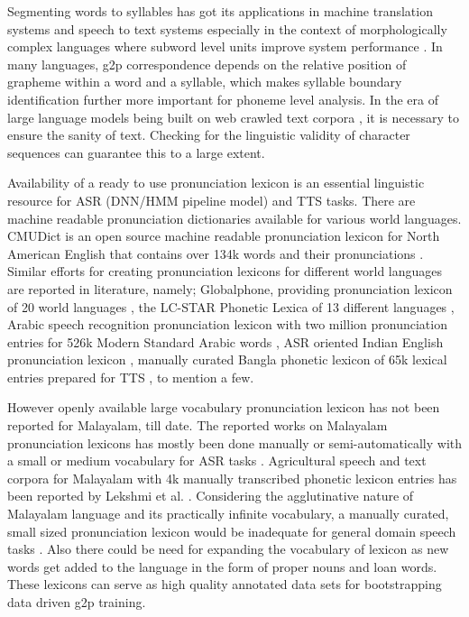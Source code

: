 \documentclass{ieeeaccess}
\begin{document}
Segmenting words to syllables has got its applications in machine translation systems and speech to text systems especially in the context of morphologically complex languages where subword level units improve system performance \cite{kunchukuttan2016, SMIT2021101158}. In many languages, g2p correspondence depends on the relative position of grapheme within a word and a syllable, which makes syllable boundary identification further more important for phoneme level analysis. In the era of large language models being built on web crawled text corpora \cite{kunchukuttan2020ai4bharat}, it is necessary to ensure the sanity of text. Checking for the linguistic validity of character sequences can guarantee this to a large extent.

Availability of a ready to use pronunciation lexicon is an essential linguistic resource for ASR (DNN/HMM pipeline model) and TTS tasks. There are machine readable pronunciation dictionaries available for various world languages. CMUDict is an open source machine readable pronunciation lexicon for North American English that contains over 134k words and their pronunciations \cite{lenzo2007cmu}. Similar efforts for creating pronunciation lexicons for different world languages are reported in literature, namely; Globalphone, providing pronunciation lexicon of 20 world languages  \cite{schultz-schlippe-2014-globalphone}, the LC-STAR Phonetic Lexica of 13 different languages  \cite{castell2004lc}, Arabic speech recognition pronunciation lexicon with two million pronunciation entries for 526k Modern Standard Arabic words \cite{ali2017}, ASR oriented Indian English pronunciation lexicon  \cite{huang-etal-2020-construction}, manually curated Bangla phonetic lexicon of 65k lexical entries prepared for TTS  \cite{ttsbangla}, to mention a few.

However openly available large vocabulary pronunciation lexicon has not been reported for Malayalam, till date. The reported works on Malayalam pronunciation lexicons has mostly been done manually or semi-automatically with a small or medium vocabulary for ASR tasks \cite{cinikurian,deekshitha}. Agricultural speech and text corpora for Malayalam with 4k manually transcribed phonetic lexicon entries has been  reported by Lekshmi et al. \cite{k-r-etal-2020-malayalam}. Considering the agglutinative nature of Malayalam language and its practically infinite vocabulary, a manually curated, small sized pronunciation lexicon would be inadequate for general domain speech tasks \cite{manohar2020quantitative}.  Also there could be need for expanding the vocabulary of lexicon as new words get added to the language in the form of proper nouns and loan words. These lexicons can serve as high quality annotated data sets for bootstrapping data driven g2p training.
\end{document}
